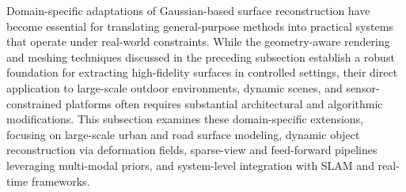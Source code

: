 \documentclass[11pt]{article}
\begin{document}
Domain-specific adaptations of Gaussian-based surface reconstruction have become essential for translating general-purpose methods into practical systems that operate under real-world constraints. While the geometry-aware rendering and meshing techniques discussed in the preceding subsection establish a robust foundation for extracting high-fidelity surfaces in controlled settings, their direct application to large-scale outdoor environments, dynamic scenes, and sensor-constrained platforms often requires substantial architectural and algorithmic modifications. This subsection examines these domain-specific extensions, focusing on large-scale urban and road surface modeling, dynamic object reconstruction via deformation fields, sparse-view and feed-forward pipelines leveraging multi-modal priors, and system-level integration with SLAM and real-time frameworks.
\end{document}
